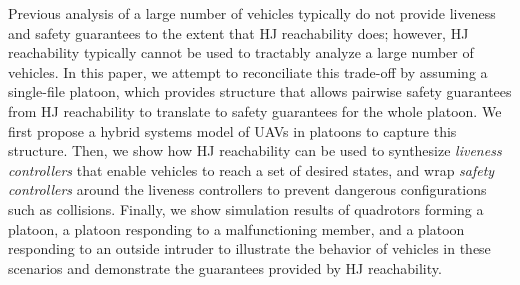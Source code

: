 Previous analysis of a large number of vehicles typically do not provide liveness and safety guarantees to the extent that HJ reachability does; however, HJ reachability typically cannot be used to tractably analyze a large number of vehicles. %
In this paper, we attempt to reconciliate this trade-off by assuming a single-file platoon, which provides structure that allows pairwise safety guarantees from HJ reachability to translate to safety guarantees for the whole platoon. We first propose a hybrid systems model of UAVs in platoons to capture this structure. Then, we show how HJ reachability can be used to synthesize \textit{liveness controllers} that enable vehicles to reach a set of desired states, and wrap \textit{safety controllers} around the liveness controllers to prevent dangerous configurations such as collisions. Finally, we show simulation results of quadrotors forming a platoon, a platoon responding to a malfunctioning member, and a platoon responding to an outside intruder to illustrate the behavior of vehicles in these scenarios and demonstrate the guarantees provided by HJ reachability.

%
%
